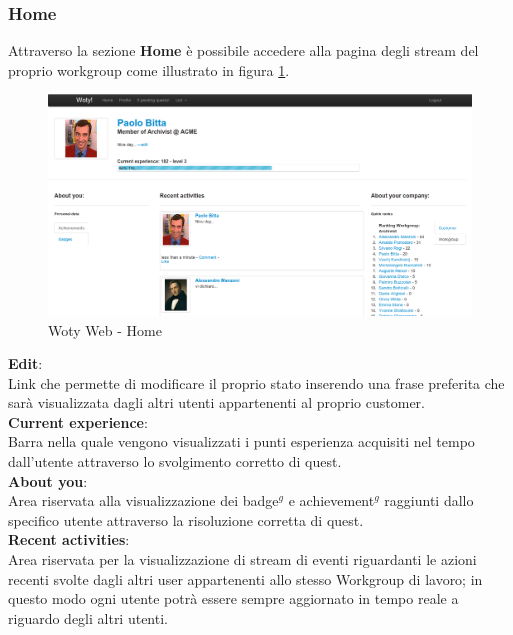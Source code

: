 \subsubsection{Home}
Attraverso la sezione \textbf{Home} è possibile accedere alla pagina degli stream del proprio workgroup come illustrato in figura \ref{ww-home}.


\begin{center}
\begin{figure}[H]
\centering
\includegraphics[scale=0.35]{images/wotyWeb/home.png}
\caption{Woty Web - Home}
\label{ww-home}
\end{figure}
\end{center}


\textbf{Edit}:\\
Link che permette di modificare il proprio stato inserendo una frase preferita che sarà visualizzata dagli altri utenti appartenenti al proprio customer.\\


\textbf{Current experience}:\\
Barra nella quale vengono visualizzati i punti esperienza acquisiti nel tempo dall'utente attraverso lo svolgimento corretto di quest.\\

\textbf{About you}:\\
Area riservata alla visualizzazione dei badge$^g$ e achievement$^g$ raggiunti dallo specifico utente attraverso la risoluzione corretta di quest.\\

\textbf{Recent activities}:\\
Area riservata per la visualizzazione di stream di eventi riguardanti le azioni recenti svolte dagli altri user appartenenti allo stesso Workgroup di lavoro; in questo modo ogni utente potrà essere sempre aggiornato in tempo reale a riguardo degli altri utenti.\\


